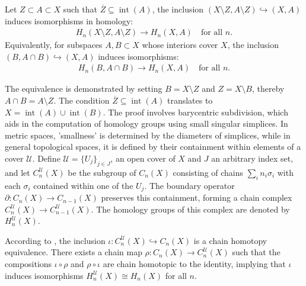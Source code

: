 \begin{theorem}[Excision]
	{\cite[Theorem 2.20]{hatcher2005algebraic}
	\label{excisiontheorem}
	Let $Z \subset A \subset X$ such that $\overline{Z}\subseteq \operatorname{int}(A)$, the inclusion $(X\setminus Z, A\setminus Z) \hookrightarrow (X, A)$ induces isomorphisms in homology}:
	\begin{align}
		H_{n}(X\setminus Z, A\setminus Z) \to H_{n}(X, A) \quad \text{for all }n. 
	\end{align}
	Equivalently, for subspaces $A, B \subset X$ whose interiors cover $X$, the
	inclusion $(B, A \cap B) \hookrightarrow (X, A)$ induces isomorphisms:
	\begin{align}
		H_{n}(B, A \cap B) \to H_{n}(X, A) \quad \text{for all }n. 
	\end{align}
\end{theorem}

The equivalence is demonstrated by setting \( B = X \setminus Z \) and \( Z = X \setminus B \), thereby \( A \cap B = A \setminus Z \). The condition \( \overline{Z} \subseteq \operatorname{int}(A) \) translates to \( X = \operatorname{int}(A) \cup \operatorname{int}(B) \). The proof involves barycentric subdivision, which aids in the computation of homology groups using small singular simplices. In metric spaces, 'smallness' is determined by the diameters of simplices, while in general topological spaces, it is defined by their containment within elements of a cover \( \mathcal{U} \). Define \( \mathcal{U} = \{U_{j}\}_{j \in J} \), an open cover of \( X \) and $J$ an arbitrary index set, and let \( C^{\mathcal{U}}_{n}(X) \) be the subgroup of \( C_{n}(X) \) consisting of chains \( \sum_{i} n_{i} \sigma_{i} \) with each \( \sigma_{i} \) contained within one of the \( U_{j} \). The boundary operator \( \partial: C_{n}(X) \to C_{n-1}(X) \) preserves this containment, forming a chain complex \( C^{\mathcal{U}}_{n}(X) \to C^{\mathcal{U}}_{n-1}(X) \). The homology groups of this complex are denoted by \( H^{\mathcal{U}}_{n}(X) \).

\begin{proposition}
	\label{baryproof}
	According to \cite[\S 2.21]{hatcher2005algebraic}, the inclusion \( \iota : C^{\mathcal{U}}_n(X) \hookrightarrow C_n(X) \) is a chain homotopy equivalence. There exists a chain map \( \rho : C_n(X) \to C^{\mathcal{U}}_n(X) \) such that the compositions \( \iota \circ \rho \) and \( \rho \circ \iota \) are chain homotopic to the identity, implying that \( \iota \) induces isomorphisms \( H^{\mathcal{U}}_n(X) \cong H_n(X) \) for all \( n \).
\end{proposition}

